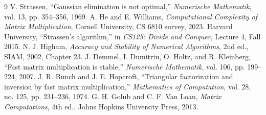\documentclass[9pt,a4paper]{article}
\begin{document}
\clearpage
\begin{thebibliography}{9}\small
{} V. Strassen, ``Gaussian elimination is not optimal,'' \emph{Numerische Mathematik}, vol. 13, pp. 354--356, 1969.
 A. He and E. Williams, \emph{Computational Complexity of Matrix Multiplication}, Cornell University, CS 6810 survey, 2023.
 Harvard University, ``Strassen's algorithm,'' in \emph{CS125: Divide and Conquer}, Lecture 4, Fall 2015.
 N. J. Higham, \emph{Accuracy and Stability of Numerical Algorithms}, 2nd ed., SIAM, 2002, Chapter 23.
 J. Demmel, I. Dumitriu, O. Holtz, and R. Kleinberg, ``Fast matrix multiplication is stable,'' \emph{Numerische Mathematik}, vol. 106, pp. 199--224, 2007.
 J. R. Bunch and J. E. Hopcroft, ``Triangular factorization and inversion by fast matrix multiplication,'' \emph{Mathematics of Computation}, vol. 28, no. 125, pp. 231--236, 1974.
 G. H. Golub and C. F. Van Loan, \emph{Matrix Computations}, 4th ed., Johns Hopkins University Press, 2013.
\end{thebibliography}
\end{document}

